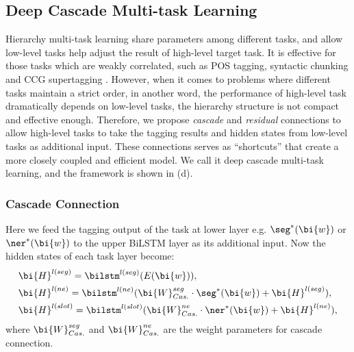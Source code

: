 \subsection{Deep Cascade Multi-task Learning}
\label{sec:dcmtl}
Hierarchy multi-task learning share parameters among different tasks,
and allow low-level tasks help adjust the result of high-level target task.
It is effective for those tasks which are weakly correlated,
such as POS tagging, syntactic chunking and CCG supertagging \cite{sogaard2016deep}.
However, when it comes to problems where different tasks maintain a 
strict order, in another word, the performance of high-level task 
dramatically depends on low-level tasks,
the hierarchy structure is not compact and effective enough.
Therefore, we propose \emph{cascade} and \emph{residual} connections
to allow high-level tasks to take the tagging results and hidden states 
from low-level tasks as additional input. 
These connections serves as ``shortcuts'' that 
create a more closely coupled and efficient model.
We call it deep cascade multi-task learning, 
and the framework is shown in (d).

\subsubsection{Cascade Connection}
Here we feed the tagging output of the task at lower layer 
e.g. $\seg^*(\bi{w})$ or $\ner^*(\bi{w})$
to the upper BiLSTM layer as its additional input.
Now the hidden states of each task layer become:
\begin{eqnarray*}
	& \bi{H}^{l(seg)}=\bilstm^{l(seg)}(E(\bi{w})), \\
	& \bi{H}^{l(ne)}= \bilstm^{l(ne)}(\bi{W}_{Cas.}^{seg}\cdot \seg^*(\bi{w})+\bi{H}^{l(seg)}), \\
	& \bi{H}^{l(slot)}= \bilstm^{l(slot)}(\bi{W}_{Cas.}^{ne}\cdot \ner^*(\bi{w})+\bi{H}^{l(ne)}),
\end{eqnarray*}
where $\bi{W}_{Cas.}^{seg}$ and $\bi{W}_{Cas.}^{ne}$ are the weight parameters for cascade connection.

